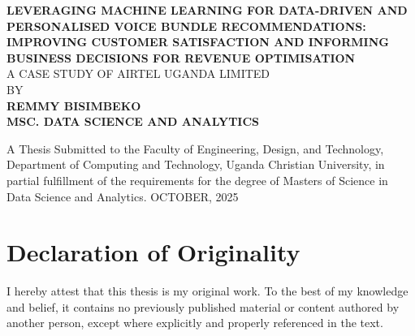 \documentclass[12pt, a4paper]{report}
\begin{document}
\begin{titlepage}
    \centering
    \vspace*{2cm}
    {\Huge \textbf{LEVERAGING MACHINE LEARNING FOR DATA-DRIVEN AND PERSONALISED VOICE BUNDLE RECOMMENDATIONS:}} \\
    \vspace{0.5cm}
    {\Large \textbf{IMPROVING CUSTOMER SATISFACTION AND INFORMING BUSINESS DECISIONS FOR REVENUE OPTIMISATION}} \\
    \vspace{1.5cm}
    {\Large A CASE STUDY OF AIRTEL UGANDA LIMITED} \\
    \vspace{2cm}
    {\Large BY} \\
    \vspace{0.5cm}
    {\Huge \textbf{REMMY BISIMBEKO}} \\
    \vspace{0.5cm}
    {\Large \textbf{MSC. DATA SCIENCE AND ANALYTICS}} \\
    \vspace{2cm}
    \begin{figure}[H]
      \centering
      \label{fig:logo}
    \end{figure}
    \vspace{1cm}
    \vfill
    A Thesis Submitted to the Faculty of Engineering, Design, and Technology, Department of Computing and Technology, Uganda Christian University, in partial fulfillment of the requirements for the degree of Masters of Science in Data Science and Analytics.
    \vspace{1cm}
    {\Large OCTOBER, 2025}
\end{titlepage}

\chapter*{Declaration of Originality}

I hereby attest that this thesis is my original work. To the best of my knowledge and belief, it contains no previously published material or content authored by another person, except where explicitly and properly referenced in the text.
\end{document}
